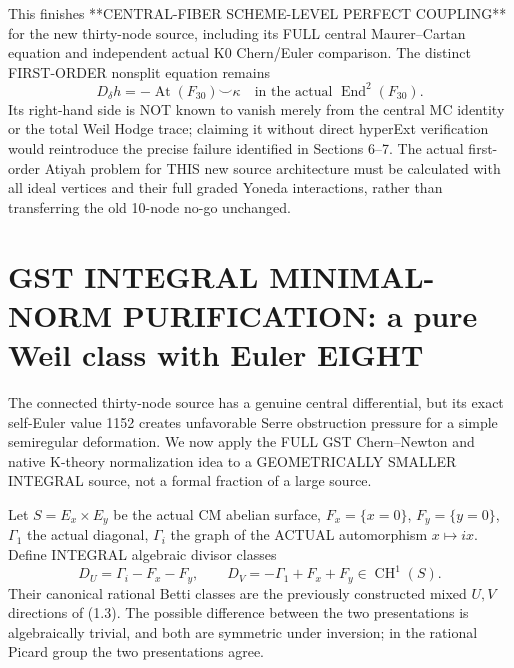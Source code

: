 \documentclass[11pt,a4paper]{article}
\newcommand{\CH}{\operatorname{CH}}
\begin{document}
This finishes
**CENTRAL-FIBER
SCHEME-LEVEL
PERFECT COUPLING**
for the new
thirty-node source,
including its
FULL central
Maurer--Cartan
equation and
independent
actual K0
Chern/Euler
comparison.
The distinct
FIRST-ORDER
nonsplit equation
remains
\[
 \boxed{
 D_\delta h
 =-\operatorname{At}(F_{30})
                      \smile\kappa
 \quad\text{in the actual }
       \operatorname{End}^2(F_{30}) .
 }                                                       \tag{10.8}
\]
Its right-hand
side is NOT
known to vanish
merely from the
central MC identity
or the total Weil
Hodge trace;
claiming it
without direct
hyperExt
verification would
reintroduce the
precise failure
identified in
Sections 6--7.
The actual
first-order
Atiyah problem
for THIS new
source architecture
must be
calculated with
all ideal
vertices and
their full
graded Yoneda
interactions,
rather than
transferring the
old 10-node
no-go unchanged.

\section{GST INTEGRAL MINIMAL-NORM PURIFICATION: a pure Weil class with Euler EIGHT}
The connected
thirty-node source
has a genuine
central differential,
but its exact
self-Euler value
1152 creates
unfavorable
Serre obstruction
pressure for
a simple
semiregular
deformation.
We now apply
the FULL GST
Chern--Newton
and native
K-theory
normalization
idea to a
GEOMETRICALLY
SMALLER INTEGRAL
source,
not a formal
fraction of
a large source.

Let \(S=E_x\times E_y\)
be the actual
CM abelian surface,
\(F_x=\{x=0\}\),
\(F_y=\{y=0\}\),
\(\Gamma_1\)
the actual diagonal,
\(\Gamma_i\)
the graph of
the ACTUAL
automorphism
\(x\mapsto i x\).
Define INTEGRAL
algebraic
divisor classes
\[
 \boxed{
 D_U=\Gamma_i-F_x-F_y,
 \qquad
 D_V=-\Gamma_1+F_x+F_y
                  \in\CH^1(S).
 }                                                       \tag{11.1}
\]
Their canonical
rational Betti
classes are
the previously
constructed
mixed
\(U,V\)
directions of
(1.3).
The possible
difference between
the two
presentations
is algebraically
trivial, and
both are
symmetric
under inversion;
in the rational
Picard group
the two
presentations
agree.
\end{document}
